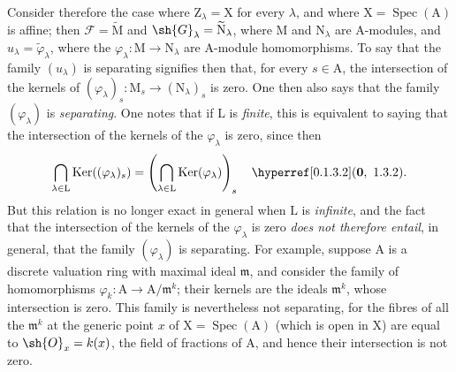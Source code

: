 \begin{env}[11.9.4]
\label{IV.11.9.4}
Consider therefore the case where $\mathrm{Z}_\lambda=\mathrm{X}$ for every $\lambda$, and where $\mathrm{X}=\operatorname{Spec}(\mathrm{A})$ is affine; then $\mathscr{F}=\widetilde{\mathrm{M}}$ and $\sh{G}_\lambda=\widetilde{\mathrm{N}}_\lambda$, where $\mathrm{M}$ and $\mathrm{N}_\lambda$ are $\mathrm{A}$-modules, and $u_\lambda=\widetilde{\varphi}_\lambda$, where the $\varphi_\lambda:\mathrm{M}\to\mathrm{N}_\lambda$ are $\mathrm{A}$-module homomorphisms.
To say that the family $(u_\lambda)$ is separating signifies then that, for every $s\in\mathrm{A}$, the intersection of the kernels of $(\varphi_\lambda)_s:\mathrm{M}_s\to(\mathrm{N}_\lambda)_s$ is zero.
One then also says that the family $(\varphi_\lambda)$ is \emph{separating}.
One notes that if $\mathrm{L}$ is \emph{finite}, this is equivalent to saying that the intersection of the kernels of the $\varphi_\lambda$ is zero, since then
\[
  \bigcap_{\lambda\in\mathrm{L}}\operatorname{Ker}((\varphi_\lambda)_s)
  =\left(\bigcap_{\lambda\in\mathrm{L}}\operatorname{Ker}(\varphi_\lambda)\right)_s
  \quad \sref[0]{0.1.3.2}.
\]
But this relation is no longer exact in general
when $\mathrm{L}$ is \emph{infinite}, and the fact that the intersection of the kernels of the $\varphi_\lambda$ is zero \emph{does not therefore entail},
in general, that the family $(\varphi_\lambda)$ is separating.
For example, suppose $\mathrm{A}$ is a discrete valuation ring with maximal ideal $\mathfrak{m}$, and consider the family of homomorphisms $\varphi_k:\mathrm{A}\to\mathrm{A}/\mathfrak{m}^k$; their kernels are the ideals $\mathfrak{m}^k$, whose intersection is zero. This family is nevertheless not separating, for the fibres of all the $\mathfrak{m}^k$ at the generic point $x$ of $\mathrm{X}=\operatorname{Spec}(\mathrm{A})$ (which is open in $\mathrm{X}$) are equal to $\sh{O}_x=k(x)$, the field of fractions of $\mathrm{A}$, and hence their intersection is not zero.
\end{env}

